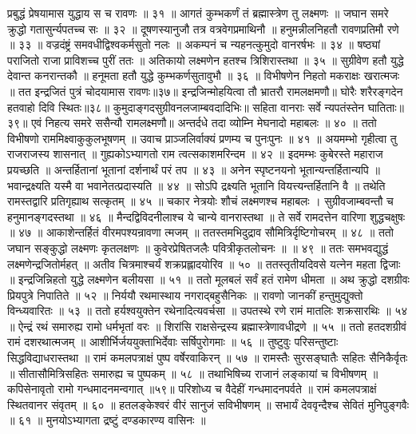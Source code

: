 प्रबुद्धं प्रेषयामास युद्धाय स च रावणः ॥ ३१ ॥
आगतं कुम्भकर्णं तं ब्रह्मास्त्रेण तु लक्ष्मणः ॥
जघान समरे क्रुद्धो गतासुर्न्यपतच्च सः ॥ ३२ ॥
दूषणस्यानुजौ तत्र वत्रवेगप्रमाथिनौ ॥
हनुमन्नीलनिहतौ रावणप्रतिमौ रणे ॥ ३३ ॥
वज्रदंष्ट्रं समवधीद्विश्वकर्मसुतो नलः ॥
अकम्पनं च न्यहनत्कुमुदो वानरर्षभः ॥ ३४ ॥
षष्ठ्यां पराजितो राजा प्राविशच्च पुरीं ततः ॥
अतिकायो लक्ष्मणेन हतश्च त्रिशिरास्तथा ॥ ३५ ॥
सुग्रीवेण हतौ युद्धे देवान्त कनरान्तकौ ॥
हनूमता हतौ युद्धे कुम्भकर्णसुतावुभौ ॥ ३६ ॥
विभीषणेन निहतो मकराक्षः खरात्मजः ॥
तत इन्द्रजितं पुत्रं चोदयामास रावणः॥३७॥
इन्द्रजिन्मोहयित्वा तौ भ्रातरौ रामलक्षमणौ॥
घोरैः शरैरङ्गदेन हतवाहो दिवि स्थितः॥३८॥
कुमुदाङ्गदसुग्रीवनलजाम्बवदादिभिः॥
सहिता वानराः सर्वे न्यपतंस्तेन घातिताः॥३९॥
एवं निहत्य समरे ससैन्यौ रामलक्ष्मणौ॥
अन्तर्दधे तदा व्योम्नि मेघनादो महाबलः ॥ ४० ॥
ततो विभीषणो राममिक्ष्वाकुकुलभूषणम् ॥
उवाच प्राञ्जलिर्वाक्यं प्रणम्य च पुनःपुनः ॥ ४१ ॥
अयमम्भो गृहीत्वा तु राजराजस्य शासनात् ॥
गुह्यकोऽभ्यागतो राम त्वत्सकाशमरिन्दम ॥ ४२ ॥
इदमम्भः कुबेरस्ते महाराज प्रयच्छति ॥
अन्तर्हितानां भूतानां दर्शनार्थं परं तप ॥ ४३ ॥
अनेन स्पृष्टनयनो भूतान्यन्तर्हितान्यपि ॥
भवान्द्रक्ष्यति यस्मै वा भवानेतत्प्रदास्यति ॥ ४४ ॥
सोऽपि द्रक्ष्यति भूतानि वियत्त्यन्तर्हितानि वै ॥
तथेति रामस्तद्वारि प्रतिगृह्याथ सत्कृतम् ॥ ४५ ॥
चकार नेत्रयोः शौचं लक्ष्मणश्च महाबलः ।
सुग्रीवजाम्बवन्तौ च हनुमानङ्गदस्तथा ॥ ४६ ॥
मैन्दद्विविदनीलाश्च ये चान्ये वानरास्तथा ॥
ते सर्वे रामदत्तेन वारिणा शुद्धचक्षुषः ॥ ४७ ॥
आकाशेन्तर्हितं वीरमपश्यन्रावणा त्मजम् ॥
ततस्तमभिदुद्राव सौमित्रिर्दृष्टिगोचरम् ॥ ४८ ॥
ततो जघान सङ्कुद्धो लक्ष्मणः कृतलक्षणः ॥
कुवेरप्रेषितजलैः पवित्रीकृतलोचनः ॥ ॥ ४९ ॥
ततः समभवद्युद्धं लक्ष्मणेन्द्रजितोर्महत् ॥
अतीव चित्रमाश्चर्यं शक्रप्रह्लादयोरिव ॥ ५० ॥
ततस्तृतीयदिवसे यत्नेन महता द्विजाः ॥
इन्द्रजिन्निहतो युद्धे लक्ष्मणेन बलीयसा ॥ ५१ ॥
ततो मूलबलं सर्वं हतं रामेण धीमता ॥
अथ क्रुद्धो दशग्रीवः प्रियपुत्रे निपातिते ॥ ५२ ॥
निर्ययौ रथमास्थाय नगराद्बहुसैनिकः ॥
रावणो जानकीं हन्तुमुद्युक्तो विन्ध्यवारितः ॥ ५३ ॥
ततो हर्यश्वयुक्तेन रथेनादित्यवर्चसा ॥
उपतस्थे रणे रामं मातलिः शक्रसारथिः ॥ ५४ ॥
ऐन्द्रं रथं समारुह्य रामो धर्मभृतां वरः ॥
शिरांसि राक्षसेन्द्रस्य ब्रह्मास्त्रेणावधीद्रणे ॥ ५५ ॥
ततो हतदशग्रीवं रामं दशरथात्मजम् ॥
आशीर्भिर्जययुक्ताभिर्देवाः सर्षिपुरोगमाः ॥ ५६ ॥
तुष्टुवुः परिसन्तुष्टाः सिद्धविद्याधरास्तथा ॥
रामं कमलपत्राक्षं पुष्प वर्षेरवाकिरन् ॥ ५७ ॥
रामस्तैः सुरसङ्घातैः सहितः सैनिकैर्वृतः ॥
सीतासौमित्रिसहितः समारुह्य च पुष्पकम् ॥ ५८ ॥
तथाभिषिच्य राजानं लङ्कायां च विभीषणम् ॥
कपिसेनावृतो रामो गन्धमादनमन्वगात् ॥५९॥
परिशोध्य च वैदेहीं गन्धमादनपर्वते ॥
रामं कमलपत्राक्षं स्थितवानर संवृतम् ॥ ६० ॥
हतलङ्केश्वरं वीरं सानुजं सविभीषणम् ॥
सभार्यं देववृन्दैश्च सेवितं मुनिपुङ्गवैः ॥ ६१ ॥
मुनयोऽभ्यागता द्रष्टुं दण्डकारण्य वासिनः ॥
